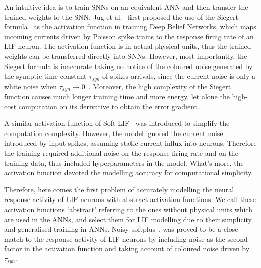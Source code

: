 \documentclass{article}
\begin{document}
An intuitive idea is to train SNNs on an equivalent ANN and then transfer the trained weights to the SNN.
Jug et al.~\cite{Jug_etal_2012} first proposed the use of the Siegert formula~\cite{siegert1951first} as the activation function in training Deep Belief Networks, which maps incoming currents driven by Poisson spike trains to the response firing rate of an LIF neuron.
The activation function is in actual physical units, thus the trained weights can be transferred directly into SNNs.
However, most importantly, the Siegert formula is inaccurate taking no notice of the coloured noise generated by the synaptic time constant $\tau_{syn}$ of spikes arrivals, since the current noise is only a white noise when $\tau_{syn} \to 0$~.
Moreover, the high complexity of the Siegert function causes much longer training time and more energy, let alone the high-cost computation on its derivative to obtain the error gradient.

A similar activation function of Soft LIF~\cite{hunsberger2015spiking} was introduced to simplify the computation complexity.
However, the model ignored the current noise introduced by input spikes, assuming static current influx into neurons.
Therefore the training required additional noise on the response firing rate and on the training data, thus included hyperparameters in the model.
What's more, the activation function devoted the modelling accuracy for computational simplicity.


Therefore, here comes the first problem of accurately modelling the neural response activity of LIF neurons with abstract activation functions.
We call these activation functions `abstract' referring to the ones without physical units which are used in the ANNs, and select them for LIF modelling due to their simplicity and generalised training in ANNs.
Noisy softplus~\cite{liu2016noisy}, was proved to be a close match to the response activity of LIF neurons by including noise as the second factor in the activation function and taking account of coloured noise driven by $\tau_{syn}$.
\end{document}
